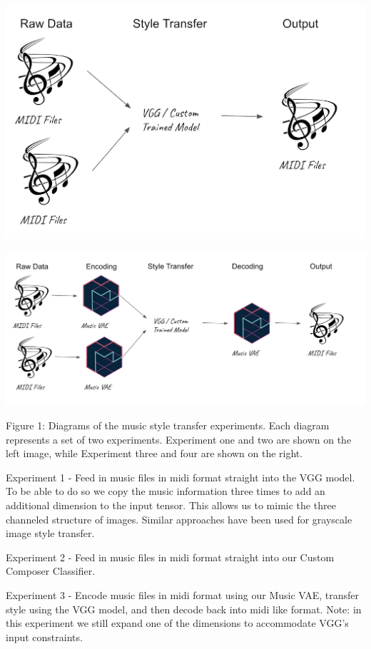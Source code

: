 \documentclass{article}
\begin{document}
\centerline{\includegraphics[width=\columnwidth]{normalstruct}}
\centerline{\includegraphics[width=\columnwidth]{vaestruct}}

Figure 1: Diagrams of the music style transfer experiments. Each diagram represents a set of two experiments. Experiment one and two are shown on the left image, while Experiment three and four are shown on the right. 

Experiment 1 - Feed in music files in midi format straight into the VGG model. To be able to do so we copy the music information three times to add an additional dimension to the input tensor. This allows us to mimic the three channeled structure of images. Similar approaches have been used for grayscale image style transfer. 

Experiment 2 - Feed in music files in midi format straight into our Custom Composer Classifier.

Experiment 3 - Encode music files in midi format using our Music VAE, transfer style using the VGG model, and then decode back into midi like format. Note: in this experiment we still expand one of the dimensions to accommodate VGG’s input constraints. 
\end{document}
